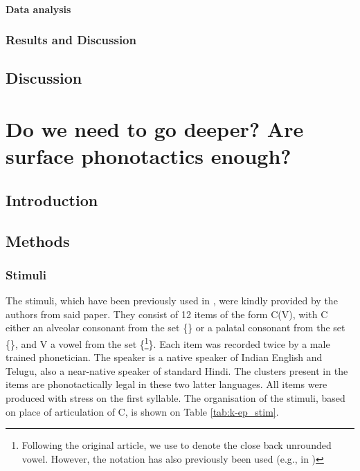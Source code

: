 {\paragraph{{\color{red}Data analysis}}

\subsubsection{Results and Discussion}

\subsection{Discussion}



\newpage
\section{{\color{red}Do we need to go deeper? Are surface phonotactics enough?}} \label{3-k-epenth}
\subsection{Introduction}
\subsection{Methods}
\subsubsection{Stimuli}

The stimuli, which have been previously used in \cite{durvasula2015}, were kindly provided by the authors from said paper. They consist of 12 items of the form C(V), with \textsc{C} either an alveolar consonant from the set \{\} or a palatal consonant from the set \{\}, and \textsc{V} a vowel from the set \{\footnote{Following the original article, we use \textipa{[1]} to denote the close back unrounded vowel. However, the notation \textipa{[W]} has also previously been used (e.g., in \cite{kabak2007})}\}.
Each item was recorded twice by a male trained phonetician. The speaker is a native speaker of Indian English and Telugu, also a near-native speaker of standard Hindi. The clusters present in the items are phonotactically legal in these two latter languages. All items were produced with stress on the first syllable.
The organisation of the stimuli, based on place of articulation of \textsc{C}, is shown on Table \ref{tab:k-ep_stim}.

}
